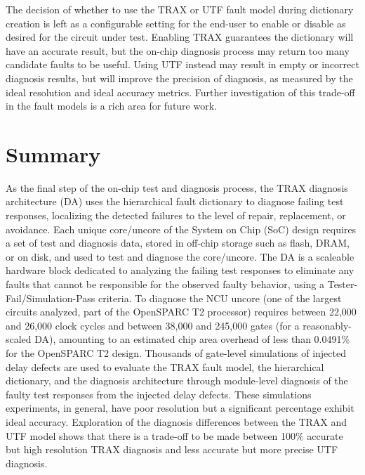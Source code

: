 The decision of whether to use the TRAX or UTF fault model during dictionary creation is left as a configurable setting for the end-user to enable or disable as desired for the circuit under test.
%
Enabling TRAX guarantees the dictionary will have an accurate result, but the on-chip diagnosis process may return too many candidate faults to be useful.
%
Using UTF instead may result in empty or incorrect diagnosis results, but will improve the precision of diagnosis, as measured by the ideal resolution and ideal accuracy metrics.
%
Further investigation of this trade-off in the fault models is a rich area for future work.


\section{Summary}
\label{sec:diag_summary}

As the final step of the on-chip test and diagnosis process, the TRAX diagnosis architecture (DA) uses the hierarchical fault dictionary to diagnose failing test responses, localizing the detected failures to the level of repair, replacement, or avoidance.
%
Each unique core/uncore of the System on Chip (SoC) design requires a set of test and diagnosis data, stored in off-chip storage such as flash, DRAM, or on disk, and used to test and diagnose the core/uncore.
%
The DA is a scaleable hardware block dedicated to analyzing the failing test responses to eliminate any faults that cannot be responsible for the observed faulty behavior, using a Tester-Fail/Simulation-Pass criteria.
%
To diagnose the NCU uncore (one of the largest circuits analyzed, part of the OpenSPARC T2 processor) requires between 22,000 and 26,000 clock cycles and between 38,000 and 245,000 gates (for a reasonably-scaled DA), amounting to an estimated chip area overhead of less than 0.0491\% for the OpenSPARC T2 design.
%
Thousands of gate-level simulations of injected delay defects are used to evaluate the TRAX fault model, the hierarchical dictionary, and the diagnosis architecture through module-level diagnosis of the faulty test responses from the injected delay defects.
%
These simulations experiments, in general, have poor resolution but a significant percentage exhibit ideal accuracy.
%
Exploration of the diagnosis differences between the TRAX and UTF model shows that there is a trade-off to be made between 100\% accurate but high resolution TRAX diagnosis and less accurate but more precise UTF diagnosis.
